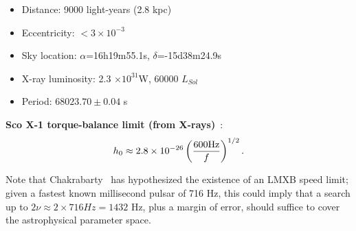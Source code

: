 \begin{itemize}
\item Distance: 9000 light-years (2.8 kpc)
\item Eccentricity: $<3\times10^{-3}$
\item Sky location: $\alpha$=16h19m55.1s, $\delta$=-15d38m24.9s
\item X-ray luminosity: 2.3 $\times10^{31}$W, 60000 $L_{Sol}$
\item Period: $68023.70 \pm 0.04$ s
\end{itemize}

\textbf{Sco X-1 torque-balance limit (from X-rays)}~\cite{Bildsten1998,GoetzThesis}:
\[
h_{0} \approx 2.8\times10^{-26}\left(\frac{600\textup{Hz}}{f}\right)^{1/2}.
\]


Note that Chakrabarty~\cite{Chakrabarty2003} has hypothesized the existence of an LMXB speed limit; given a fastest known millisecond pulsar of 716 Hz, this could imply that a search up to $2\nu \approx 2\times716 Hz = 1432$ Hz, plus a margin of error, should suffice to cover the astrophysical parameter space. 








